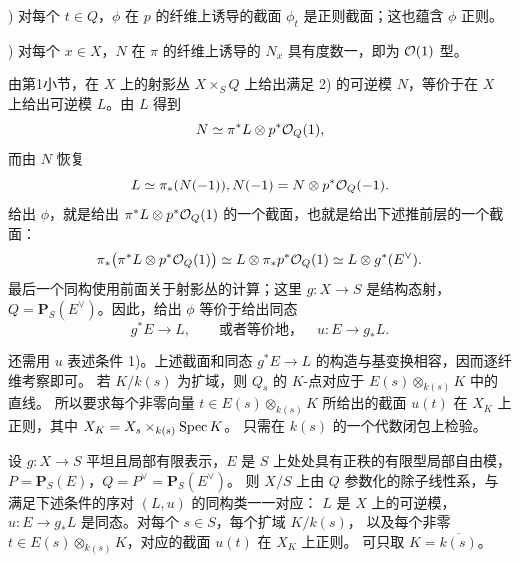 ) 对每个 \(t\in Q\)，\(\phi\) 在 \(p\) 的纤维上诱导的截面 \(\phi_t\) 是正则截面；这也蕴含 \(\phi\) 正则。

) 对每个 \(x\in X\)，\(N\) 在 \(\pi\) 的纤维上诱导的 \(N_x\) 具有度数一，即为 \(\mathcal O(1)\) 型。

由第1小节，在 \(X\) 上的射影丛 \(X\times_S Q\) 上给出满足 2) 的可逆模 \(N\)，等价于在 \(X\) 上给出可逆模 \(L\)。由 \(L\) 得到
\[
 N\simeq \pi^*L\otimes p^*\mathcal O_Q(1),
\]
而由 \(N\) 恢复
\[
 L\simeq \pi_*(N(-1)), N(-1)=N\otimes p^*\mathcal O_Q(-1).
\]
给出 \(\phi\)，就是给出 \(\pi^*L\otimes p^*\mathcal O_Q(1)\) 的一个截面，也就是给出下述推前层的一个截面：
\[
 \pi_*\bigl(\pi^*L\otimes p^*\mathcal O_Q(1)\bigr)
 \simeq L\otimes\pi_*p^*\mathcal O_Q(1)
 \simeq L\otimes g^*(E^\vee).
\]
最后一个同构使用前面关于射影丛的计算；这里 \(g:X\to S\) 是结构态射，\(Q=\mathbf P_S(E^\vee)\)。因此，给出 \(\phi\) 等价于给出同态
\[
 g^*E\longrightarrow L,
 \qquad\text{或者等价地，}\quad u:E\longrightarrow g_*L.
\]


还需用 \(u\) 表述条件 1)。上述截面和同态 \(g^*E\to L\) 的构造与基变换相容，因而逐纤维考察即可。
若 \(K/k(s)\) 为扩域，则 \(Q_s\) 的 \(K\)-点对应于 \(E(s)\otimes_{k(s)} K\) 中的直线。
所以要求每个非零向量 \(t\in E(s)\otimes_{k(s)}K\) 所给出的截面 \(u(t)\) 在 \(X_K\) 上正则，其中 \(X_K=X_s\times_{k(s)}\operatorname{Spec} K\)。
只需在 \(k(s)\) 的一个代数闭包上检验。


设 \(g:X\to S\) 平坦且局部有限表示，\(E\) 是 \(S\) 上处处具有正秩的有限型局部自由模，
\(P=\mathbf P_S(E)\)，\(Q=P^\vee=\mathbf P_S(E^\vee)\)。
则 \(X/S\) 上由 \(Q\) 参数化的除子线性系，与满足下述条件的序对 \((L,u)\) 的同构类一一对应：
\(L\) 是 \(X\) 上的可逆模，\(u:E\to g_*L\) 是同态。对每个 \(s\in S\)，每个扩域 \(K/k(s)\)，
以及每个非零 \(t\in E(s)\otimes_{k(s)}K\)，对应的截面 \(u(t)\) 在 \(X_K\) 上正则。
可只取 \(K=\overline{k(s)}\)。

